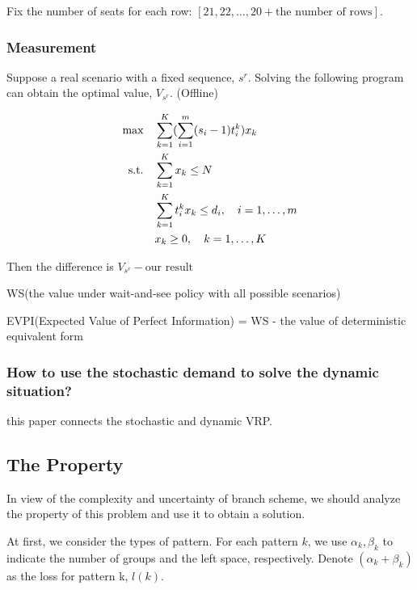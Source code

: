 Fix the number of seats for each row: $[21, 22, \ldots, 20 + \text{the number of rows}]$.

\subsubsection{Measurement}

Suppose a real scenario with a fixed sequence, $s^{r}$. Solving the following program can obtain the optimal value, $V_{s^{r}}$. (Offline)

\begin{equation*}
\begin{aligned}
  \mbox{max}\quad & \sum_{k=1}^K(\sum_{i=1}^m (s_i-1)t_i^k) x_{k} \\
  \mbox{s.t.} \quad & \sum_{k=1}^K x_{k} \leq N \\
  & \sum_{k=1}^K t_i^k x_k \leq d_i,\quad i=1,\ldots,m \\
  & x_{k} \geq 0, \quad k = 1,\ldots,K \notag
\end{aligned}
\end{equation*}

Then the difference is $V_{s^{r}} - \text{our result}$

WS(the value under wait-and-see policy with all possible scenarios)

EVPI(Expected Value of Perfect Information) = WS - the value of deterministic equivalent form


\subsubsection{How to use the stochastic demand to solve the dynamic situation?}

\cite{bent2004scenario} this paper connects the stochastic and dynamic VRP.


\subsection{The Property}
In view of the complexity and uncertainty of branch scheme, we should analyze the property of this problem and use it to obtain a solution.

At first, we consider the types of pattern. For each pattern $k$, we use $\alpha_k, \beta_k$ to indicate the number of groups and the left space, respectively. Denote $(\alpha_k + \beta_k)$ as the loss for pattern k, $l(k)$.


